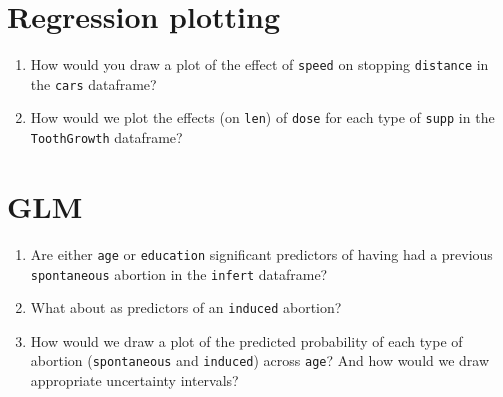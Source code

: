 \documentclass[12pt,a4paper]{article}
\begin{document}
\section*{Regression plotting}
\begin{enumerate}
\item How would you draw a plot of the effect of \texttt{speed} on stopping \texttt{distance} in the \texttt{cars} dataframe?
\item How would we plot the effects (on \texttt{len}) of \texttt{dose} for each type of \texttt{supp} in the \texttt{ToothGrowth} dataframe?
\end{enumerate}

\section*{GLM}
\begin{enumerate}
\item Are either \texttt{age} or \texttt{education} significant predictors of having had a previous \texttt{spontaneous} abortion in the \texttt{infert} dataframe?
\item What about as predictors of an \texttt{induced} abortion?
\item How would we draw a plot of the predicted probability of each type of abortion (\texttt{spontaneous} and \texttt{induced}) across \texttt{age}? And how would we draw appropriate uncertainty intervals?
\end{enumerate}
\end{document}
